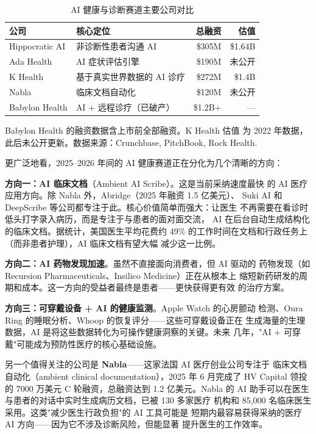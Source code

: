 \begin{table}[htbp]
\centering
\caption{AI 健康与诊断赛道主要公司对比}
\label{tab:health-comparison}
\small
\begin{tabularx}{\textwidth}{l X r r}
\toprule
\rowcolor{figLightGray}
\textbf{公司} & \textbf{核心定位} & \textbf{总融资} & \textbf{估值} \\
\midrule
Hippocratic AI  & 非诊断性患者沟通 AI      & \$305M     & \$1.64B \\
Ada Health      & AI 症状评估引擎          & \$190M     & 未公开 \\
K Health        & 基于真实世界数据的 AI 诊疗 & \$272M    & \$1.4B \\
Nabla           & 临床文档自动化            & \$120M     & 未公开 \\
Babylon Health  & AI + 远程诊疗（已破产）   & \$1.2B+    & --- \\
\bottomrule
\end{tabularx}

\medskip
\noindent \small Babylon Health 的融资数据含上市前全部融资。K Health 估值
为 2022 年数据，此后未公开更新。数据来源：Crunchbase, PitchBook,
Rock Health.
\end{table}

更广泛地看，2025--2026 年间的 AI 健康赛道正在分化为几个清晰的方向：

\textbf{方向一：AI 临床文档}（Ambient AI Scribe）。这是当前采纳速度最快
的 AI 医疗应用方向。除 Nabla 外，Abridge（2025 年融资 1.5 亿美元）、
Suki AI 和 DeepScribe 等公司都专注于此。核心价值简单而强大：让医生
不再需要在看诊时低头打字录入病历，而是专注于与患者的面对面交流，
AI 在后台自动生成结构化的临床文档。据统计，美国医生平均花费约 49\%
的工作时间在文档和行政任务上（而非患者护理），AI 临床文档有望大幅
减少这一比例。

\textbf{方向二：AI 药物发现加速}。虽然不直接面向消费者，但 AI 驱动的
药物发现（如 Recursion Pharmaceuticals、Insilico Medicine）正在从根本上
缩短新药研发的周期和成本。这一方向的受益者最终是患者——更快获得更有效
的治疗方案。

\textbf{方向三：可穿戴设备 + AI 的健康监测}。Apple Watch 的心房颤动
检测、Oura Ring 的睡眠分析、Whoop 的恢复评分——这些可穿戴设备正在
生成海量的生理数据，AI 是将这些数据转化为可操作健康洞察的关键。未来
几年，"AI + 可穿戴"可能成为预防性医疗的核心基础设施。

另一个值得关注的公司是 \textbf{Nabla}——这家法国 AI 医疗创业公司专注于
临床文档自动化（ambient clinical documentation），2025 年 6 月完成了
HV Capital 领投的 7000 万美元 C 轮融资，总融资达到 1.2 亿美元。Nabla
的 AI 助手可以在医生与患者的对话中实时生成病历文档，已被 130 多家医疗
机构和 85,000 名临床医生采用。这类"减少医生行政负担"的 AI 工具可能是
短期内最容易获得采纳的医疗 AI 方向——因为它不涉及诊断风险，但能显著
提升医生的工作效率。

